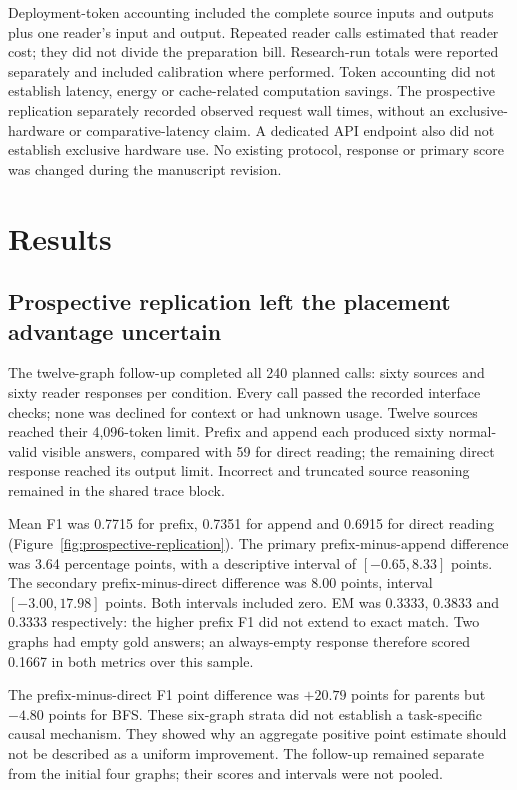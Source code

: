 Deployment-token accounting included the complete source inputs and outputs plus one reader's input and output. Repeated reader calls estimated that reader cost; they did not divide the preparation bill. Research-run totals were reported separately and included calibration where performed. Token accounting did not establish latency, energy or cache-related computation savings. The prospective replication separately recorded observed request wall times, without an exclusive-hardware or comparative-latency claim. A dedicated API endpoint also did not establish exclusive hardware use. No existing protocol, response or primary score was changed during the manuscript revision.

\section{Results}
\label{sec:migration-results}
\subsection{Prospective replication left the placement advantage uncertain}
\label{sec:prospective-replication}
The twelve-graph follow-up completed all 240 planned calls: sixty sources and sixty reader responses per condition. Every call passed the recorded interface checks; none was declined for context or had unknown usage. Twelve sources reached their 4,096-token limit. Prefix and append each produced sixty normal-valid visible answers, compared with 59 for direct reading; the remaining direct response reached its output limit. Incorrect and truncated source reasoning remained in the shared trace block.

Mean F1 was 0.7715 for prefix, 0.7351 for append and 0.6915 for direct reading (Figure~\ref{fig:prospective-replication}). The primary prefix-minus-append difference was 3.64 percentage points, with a descriptive interval of $[-0.65,8.33]$ points. The secondary prefix-minus-direct difference was 8.00 points, interval $[-3.00,17.98]$ points. Both intervals included zero. EM was 0.3333, 0.3833 and 0.3333 respectively: the higher prefix F1 did not extend to exact match. Two graphs had empty gold answers; an always-empty response therefore scored 0.1667 in both metrics over this sample.

The prefix-minus-direct F1 point difference was $+20.79$ points for parents but $-4.80$ points for BFS. These six-graph strata did not establish a task-specific causal mechanism. They showed why an aggregate positive point estimate should not be described as a uniform improvement. The follow-up remained separate from the initial four graphs; their scores and intervals were not pooled.

